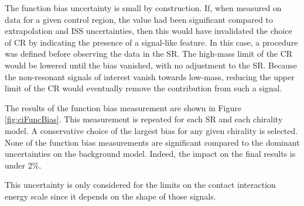 The function bias uncertainty is small by construction.
If, when measured on data for a given control region, the value had been significant compared to extrapolation and ISS uncertainties, then this would have invalidated the choice of CR by indicating the presence of a signal-like feature.
In this case, a procedure was defined before observing the data in the SR.
The high-mass limit of the CR would be lowered until the bias vanished, with no adjustment to the SR. 
Because the non-resonant signals of interest vanish towards low-mass, reducing the upper limit of the CR would eventually remove the contribution from such a signal.

The results of the function bias measurement are shown in Figure \ref{fig:ciFuncBias}.
This measurement is repeated for each SR and each chirality model.
A conservative choice of the largest bias for any given chirality is selected.
None of the function bias measurements are significant compared to the dominant uncertainties on the background model.
Indeed, the impact on the final results is under 2\%.

This uncertainty is only considered for the limits on the contact interaction energy scale \lam since it depends on the shape of those signals.

